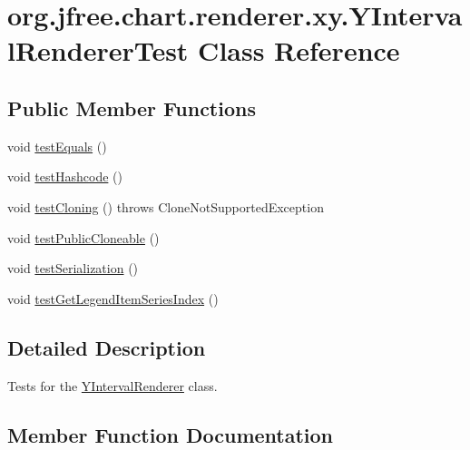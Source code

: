 \hypertarget{classorg_1_1jfree_1_1chart_1_1renderer_1_1xy_1_1_y_interval_renderer_test}{}\section{org.\+jfree.\+chart.\+renderer.\+xy.\+Y\+Interval\+Renderer\+Test Class Reference}
\label{classorg_1_1jfree_1_1chart_1_1renderer_1_1xy_1_1_y_interval_renderer_test}
\subsection*{Public Member Functions}
\begin{DoxyCompactItemize}
\item 
void \mbox{\hyperlink{classorg_1_1jfree_1_1chart_1_1renderer_1_1xy_1_1_y_interval_renderer_test_a15c85d22384fc22791b0e8f24e26f215}{test\+Equals}} ()
\item 
void \mbox{\hyperlink{classorg_1_1jfree_1_1chart_1_1renderer_1_1xy_1_1_y_interval_renderer_test_ac68919081cd181b8c8c7ce92f2adf14c}{test\+Hashcode}} ()
\item 
void \mbox{\hyperlink{classorg_1_1jfree_1_1chart_1_1renderer_1_1xy_1_1_y_interval_renderer_test_a12969904792b36b0205d990545b0b888}{test\+Cloning}} ()  throws Clone\+Not\+Supported\+Exception 
\item 
void \mbox{\hyperlink{classorg_1_1jfree_1_1chart_1_1renderer_1_1xy_1_1_y_interval_renderer_test_a5be0daeae13ef2f39f1bbd48e145f6c0}{test\+Public\+Cloneable}} ()
\item 
void \mbox{\hyperlink{classorg_1_1jfree_1_1chart_1_1renderer_1_1xy_1_1_y_interval_renderer_test_a6551844dc19ccd5e87bf71645b6fd1eb}{test\+Serialization}} ()
\item 
void \mbox{\hyperlink{classorg_1_1jfree_1_1chart_1_1renderer_1_1xy_1_1_y_interval_renderer_test_aff24f1d7640ac32c0871ea41eef33941}{test\+Get\+Legend\+Item\+Series\+Index}} ()
\end{DoxyCompactItemize}


\subsection{Detailed Description}
Tests for the \mbox{\hyperlink{classorg_1_1jfree_1_1chart_1_1renderer_1_1xy_1_1_y_interval_renderer}{Y\+Interval\+Renderer}} class. 

\subsection{Member Function Documentation}
\mbox{\label{classorg_1_1jfree_1_1chart_1_1renderer_1_1xy_1_1_y_interval_renderer_test_a12969904792b36b0205d990545b0b888}} 
